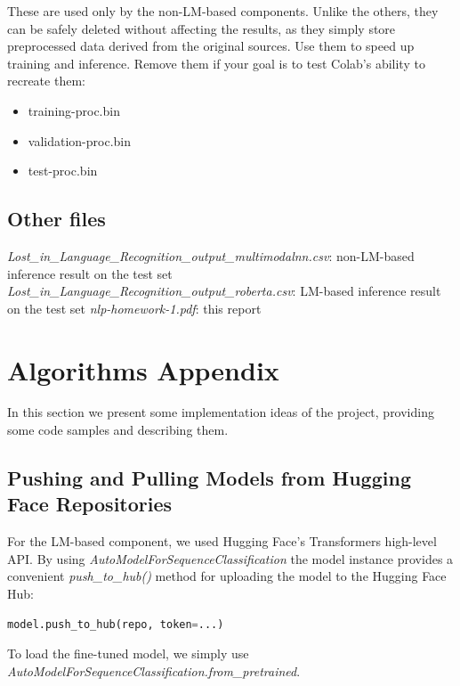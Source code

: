 \documentclass[11pt]{article}
\begin{document}
	 These are used only by the non-LM-based components. Unlike the others, 
	 they can be safely deleted without affecting the results, 
	 as they simply store preprocessed data derived from the original sources. 
	 Use them to speed up training and inference. 
	 Remove them if your goal is to test Colab’s ability to recreate them:
	 
	 \begin{itemize}
	 	\item training-proc.bin
	 	\item validation-proc.bin
	 	\item test-proc.bin
	 \end{itemize}
	
	\subsection{Other files}
	
	\emph{Lost\_in\_Language\_Recognition\_output\_multimodalnn.csv}: non-LM-based inference result on the test set
	\emph{Lost\_in\_Language\_Recognition\_output\_roberta.csv}: LM-based inference result on the test set
	\emph{nlp-homework-1.pdf}: this report
	
	\section{Algorithms  Appendix}
	\label{sec:appendix}
	
	In this section we present some implementation ideas of the project, providing some
	code samples and describing them.
	
	\subsection{Pushing and Pulling Models from Hugging Face Repositories}
	
	For the LM-based component, we used Hugging Face’s Transformers high-level API. By using \emph{AutoModelForSequenceClassification}  the model instance provides a convenient 
	\emph{push\_to\_hub()} method for uploading the model to the Hugging Face Hub:
	
	\small
	\begin{lstlisting}[language=python]
model.push_to_hub(repo, token=...)
	\end{lstlisting}
	\normalsize
	
	To load the fine-tuned model, we simply use \emph{AutoModelForSequenceClassification.from\_pretrained}.
	
\end{document}
